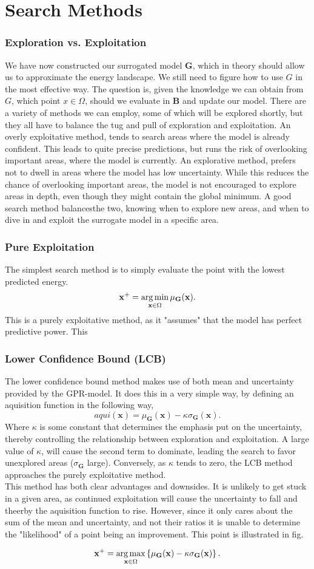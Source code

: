 \chapter{Search Methods}
\subsection{Exploration vs. Exploitation}
We have now constructed our surrogated model $\bm{G}$, which in theory should allow us to approximate the energy landscape. We still need to figure how to use $G$ in the most effective way. The question is, given the knowledge we can obtain from $G$, which point $x \in \Omega$, should we evaluate in $\bm{B}$ and update our model. There are a variety of methods we can employ, some of which will be explored shortly, but they all have to balance the tug and pull of exploration and exploitation. An overly exploitative method, tends to search areas where the model is already confident. This leads to quite precise predictions, but runs the risk of overlooking important areas, where the model is currently. An explorative method, prefers not to dwell in areas where the model has low uncertainty. While this reduces the chance of overlooking important areas, the model is not encouraged to explore areas in depth, even though they might contain the global minimum. A good search method balancesthe two, knowing when to explore new areas, and when to dive in and exploit the surrogate model in a specific area. 
\subsection{Pure Exploitation}
The simplest search method is to simply evaluate the point with the lowest predicted energy.
\[
\mathbf{x}^{+} = \operatorname*{arg\,min}_{\mathbf{x} \in \Omega} \mu_{\mathbf{G}}(\mathbf{x})
.\] 
This is a purely exploitative method, as it "assumes" that the model has perfect predictive power. This 
\subsection{Lower Confidence Bound (LCB)}
The lower confidence bound method makes use of both mean and uncertainty provided by the GPR-model. It does this in a very simple way, by defining an aquisition function in the following way,
\[
aqui\left( \bm{x} \right) = \mu _{\bm{G}}\left( \bm{x} \right)  - \kappa \sigma_{\bm{G}}\left( \bm{x} \right) 
.\] 
Where $\kappa$ is some constant that determines the emphasis put on the uncertainty, thereby controlling the relationship between exploration and exploitation. A large value of $\kappa$, will cause the second term to dominate, leading the search to favor unexplored areas ($\sigma_{\bm{G}}$ large). Conversely, as $\kappa$ tends to zero, the LCB method approaches the purely exploitative method. \\
This method has both clear advantages and downsides. It is unlikely to get stuck in a given area, as continued exploitation will cause the uncertainty to fall and theerby the aquisition function to rise. However, since it only cares about the sum of the mean and uncertainty, and not their ratios it is unable to determine the "likelihood" of a point being an improvement. This point is illustrated in {fig}.

\[
\mathbf{x}^{+} = \operatorname*{arg\,max}_{\mathbf{x} \in \Omega} \left\{ \mu_{\mathbf{G}}(\mathbf{x}) - \kappa \sigma_{\mathbf{G}}(\mathbf{x}) \right\}
.\] 
